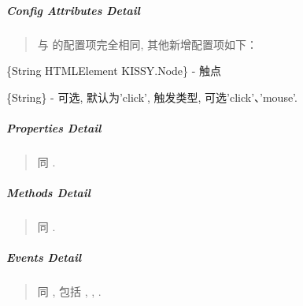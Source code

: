 \documentclass[letterpaper,10pt,english]{sphinxmanual}
\begin{document}
\subparagraph{Config Attributes Detail}
\label{api/component/overlay/popup:config-attributes-detail}\begin{quote}

与 {\hyperref[api/component/overlay/popup:module-Overlay]{}} 的配置项完全相同, 其他新增配置项如下：
\end{quote}


\begin{fulllineitems}
\label{api/component/overlay/popup:Overlay.trigger}
\{String \textbar{} HTMLElement \textbar{} KISSY.Node\} - 触点

\end{fulllineitems}



\begin{fulllineitems}
\label{api/component/overlay/popup:Overlay.triggerType}
\{String\} - 可选, 默认为'click', 触发类型, 可选'click'、'mouse'.

\end{fulllineitems}



\subparagraph{Properties Detail}
\label{api/component/overlay/popup:properties-detail}\begin{quote}

同 {\hyperref[api/component/overlay/popup:module-Overlay]{}} .
\end{quote}


\subparagraph{Methods Detail}
\label{api/component/overlay/popup:methods-detail}\begin{quote}

同 {\hyperref[api/component/overlay/popup:module-Overlay]{}} .
\end{quote}


\subparagraph{Events Detail}
\label{api/component/overlay/popup:events-detail}\begin{quote}

同 {\hyperref[api/component/overlay/popup:module-Overlay]{}} , 包括 {\hyperref[api/component/overlay/overlay:Overlay.show]{}} , {\hyperref[api/component/overlay/overlay:Overlay.hide]{}} , {\hyperref[api/component/overlay/overlay:Overlay.beforeVisibleChange]{}} .
\end{quote}
\end{document}

